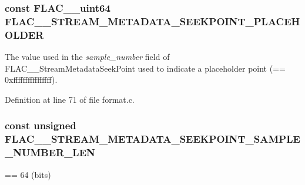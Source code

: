 \subsubsection[{\texorpdfstring{F\+L\+A\+C\+\_\+\+\_\+\+S\+T\+R\+E\+A\+M\+\_\+\+M\+E\+T\+A\+D\+A\+T\+A\+\_\+\+S\+E\+E\+K\+P\+O\+I\+N\+T\+\_\+\+P\+L\+A\+C\+E\+H\+O\+L\+D\+ER}{FLAC__STREAM_METADATA_SEEKPOINT_PLACEHOLDER}}]{ {\bf const} {\bf F\+L\+A\+C\+\_\+\+\_\+uint64} F\+L\+A\+C\+\_\+\+\_\+\+S\+T\+R\+E\+A\+M\+\_\+\+M\+E\+T\+A\+D\+A\+T\+A\+\_\+\+S\+E\+E\+K\+P\+O\+I\+N\+T\+\_\+\+P\+L\+A\+C\+E\+H\+O\+L\+D\+ER}\hypertarget{group__flac__format_ga39373aa806e3132146c1f29f35a23877}{}\label{group__flac__format_ga39373aa806e3132146c1f29f35a23877}
The value used in the {\itshape sample\+\_\+number} field of F\+L\+A\+C\+\_\+\+\_\+\+Stream\+Metadata\+Seek\+Point used to indicate a placeholder point (== 0xffffffffffffffff). 

Definition at line 71 of file format.\+c.

\subsubsection[{\texorpdfstring{F\+L\+A\+C\+\_\+\+\_\+\+S\+T\+R\+E\+A\+M\+\_\+\+M\+E\+T\+A\+D\+A\+T\+A\+\_\+\+S\+E\+E\+K\+P\+O\+I\+N\+T\+\_\+\+S\+A\+M\+P\+L\+E\+\_\+\+N\+U\+M\+B\+E\+R\+\_\+\+L\+EN}{FLAC__STREAM_METADATA_SEEKPOINT_SAMPLE_NUMBER_LEN}}]{ {\bf const} unsigned F\+L\+A\+C\+\_\+\+\_\+\+S\+T\+R\+E\+A\+M\+\_\+\+M\+E\+T\+A\+D\+A\+T\+A\+\_\+\+S\+E\+E\+K\+P\+O\+I\+N\+T\+\_\+\+S\+A\+M\+P\+L\+E\+\_\+\+N\+U\+M\+B\+E\+R\+\_\+\+L\+EN}\hypertarget{group__flac__format_ga8fe65704a9be1ad13a1654e78ab80c32}{}\label{group__flac__format_ga8fe65704a9be1ad13a1654e78ab80c32}
== 64 (bits) 

